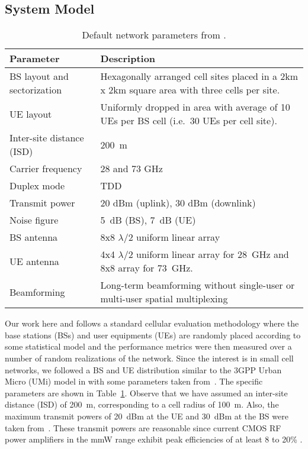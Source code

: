 \documentclass[journal]{IEEEtran}
\begin{document}
\subsection{System Model}
\begin{table}
\caption{Default network parameters from \cite{AkLiuRanRapEr:13-arxiv}.}
\label{table:para}
\hfill{}
 \begin{tabular}{|>{\raggedright}p{1.25in}|>{\raggedright}p{1.75in}|}
	\hline
	\textbf{Parameter}  &  \textbf{Description} \tabularnewline \hline
	BS layout and sectorization &
        Hexagonally arranged cell sites placed in a 2km x 2km square area
        with three cells per site. \tabularnewline \hline
	UE layout   &   Uniformly dropped in area with average of 10 UEs per
        BS cell (i.e.\ 30 UEs per cell site).
        \tabularnewline \hline
	Inter-site distance (ISD) &    200~m \tabularnewline \hline
    Carrier frequency & 28 and 73 GHz \tabularnewline \hline
    Duplex mode & TDD \tabularnewline \hline
	Transmit power  &  20 dBm (uplink), 30 dBm (downlink) \tabularnewline \hline
	Noise figure  &  5~dB (BS), 7~dB (UE) \tabularnewline \hline
    BS antenna & 8x8 $\lambda/2$ uniform linear array \tabularnewline \hline
    UE antenna & 4x4 $\lambda/2$ uniform linear array for 28~GHz and
          8x8 array for 73~GHz.  \tabularnewline \hline
    Beamforming & Long-term beamforming without single-user or multi-user
    spatial multiplexing \tabularnewline \hline
  \end{tabular}
\hfill{}
\end{table}


Our work here and \cite{AkLiuRanRapEr:13-arxiv} follows a
standard cellular evaluation methodology \cite{3GPP36.814}
where the base stations (BSs) and user equipments (UEs)
are randomly placed according to some statistical model and the performance
metrics were then measured over a number of random realizations of the network.
Since the interest is in small cell networks, we followed a BS and UE distribution
similar to the 3GPP Urban Micro (UMi) model in \cite{3GPP36.814} with some
parameters taken from~\cite{KhanPi:11,KhanPi:11-CommMag}.
The specific parameters are shown in Table~\ref{table:para}.
Observe that we have assumed an inter-site distance (ISD) of 200~m,
corresponding to a cell radius of 100~m.  Also,
the maximum transmit powers of 20~dBm at the UE and
30~dBm at the BS were taken from~\cite{KhanPi:11,KhanPi:11-CommMag}.  These transmit powers
are reasonable since current CMOS RF power amplifiers in the mmW range
exhibit peak efficiencies of at least 8 to 20\% \cite{Ted:60Gstate11,Z3,Z4}.
\end{document}
